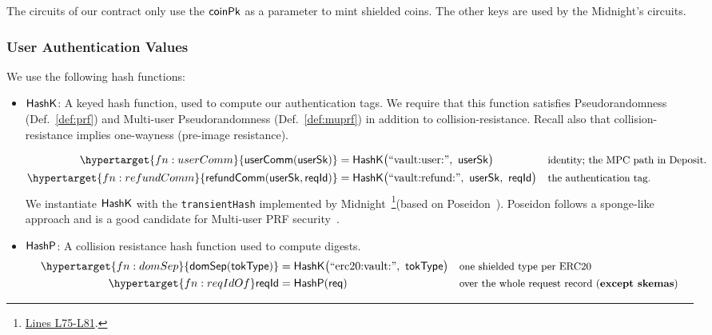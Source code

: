 The  circuits  of our contract only use the $\mathsf{coinPk}$ as a parameter to mint shielded coins.
The other keys are used by the Midnight's circuits.


\subsubsection{User Authentication Values}
\label{ssec:derived}
\label{ssec:hashcomputation}
We use the following hash functions:
\begin{itemize}
    \item $\mathsf{HashK}$: A keyed hash function, used to compute our authentication tags. We require that this function satisfies Pseudorandomness (Def.~\ref{def:prf}) and Multi-user Pseudorandomness (Def.~\ref{def:muprf}) in addition to collision-resistance. Recall also that collision-resistance implies one-wayness (pre-image resistance).

    \begin{align*}
\hypertarget{fn:userComm}{\userComm(\usersk)} &= \Hash\bigl(\text{``vault:user:''}\bc \usersk\bigr)
  &&\text{\small identity; the MPC path in Deposit. }\\
\hypertarget{fn:refundComm}{\refundComm(\usersk, \rid)} &= \Hash\bigl(\text{``vault:refund:''}\bc \usersk\bc \rid\bigr)
  &&\text{\small the authentication tag.}
\end{align*}
We instantiate $\mathsf{HashK}$ with the \texttt{transientHash} implemented by Midnight~\footnote{\href{https://github.com/midnightntwrk/midnight-ledger/blob/cc909e042a17695f7ba62fc195a8d770d150b63e/transient-crypto/src/hash.rs}{Lines L75-L81}.}(based on Poseidon~\cite{poseidon}).
Poseidon follows a sponge-like approach and is a good candidate for Multi-user PRF security~\cite{KeyedDuplex17}.

    \item $\mathsf{HashP}$: A collision resistance hash function used to compute digests.
    \begin{align*}
\hypertarget{fn:domSep}{\domSep(\tokType)} &= \Hash\bigl(\text{``erc20:vault:''}\bc \tokType\bigr)
  &&\text{\small one shielded type per ERC20}\\
 \hypertarget{fn:reqIdOf}\rid &= \Kec(\req)
   &&\text{\small over the whole request record (\textbf{except skemas})}\\
\end{align*}
\end{itemize}


